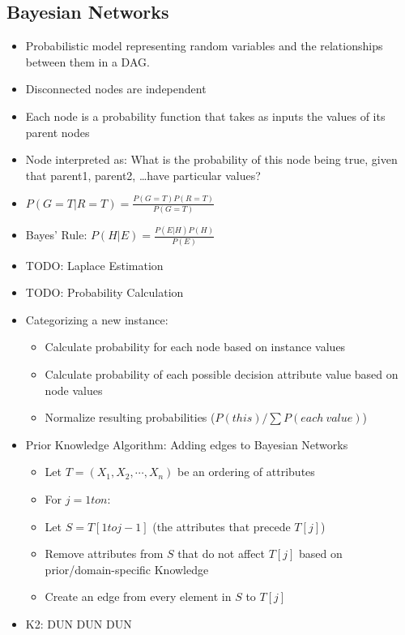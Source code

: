 \documentclass{article}
\begin{document}
\subsection{Bayesian Networks}
\begin{itemize}
	\item Probabilistic model representing random variables and the relationships between them in a DAG.
	\item Disconnected nodes are independent
	\item Each node is a probability function that takes as inputs the values of its parent nodes
	\item Node interpreted as: What is the probability of this node being true, given that parent1, parent2, \ldots have particular values?
	\item $P(G = T | R = T) = \frac{P(G = T) P(R = T)}{P(G = T)}$
	\item Bayes' Rule: $P(H | E) = \frac{P(E | H) P(H)}{P(E)}$
	\item TODO: Laplace Estimation
	\item TODO: Probability Calculation
	\item Categorizing a new instance:
		\begin{itemize}
			\item Calculate probability for each node based on instance values
			\item Calculate probability of each possible decision attribute value based on node values
			\item Normalize resulting probabilities ($P(this) / \sum P(each\ value)$)
		\end{itemize}
	\item Prior Knowledge Algorithm: Adding edges to Bayesian Networks
		\begin{itemize}
			\item Let $T = (X_1, X_2, \cdots, X_n)$ be an ordering of attributes
			\item For $j = 1 to n$:
			\item Let $S = T[1 to j - 1]$ (the attributes that precede $T[j]$)
			\item Remove attributes from $S$ that do not affect $T[j]$ based on prior/domain-specific Knowledge
			\item Create an edge from every element in $S$ to $T[j]$
		\end{itemize}
	\item K2: DUN DUN DUN

\end{itemize}
\end{document}
